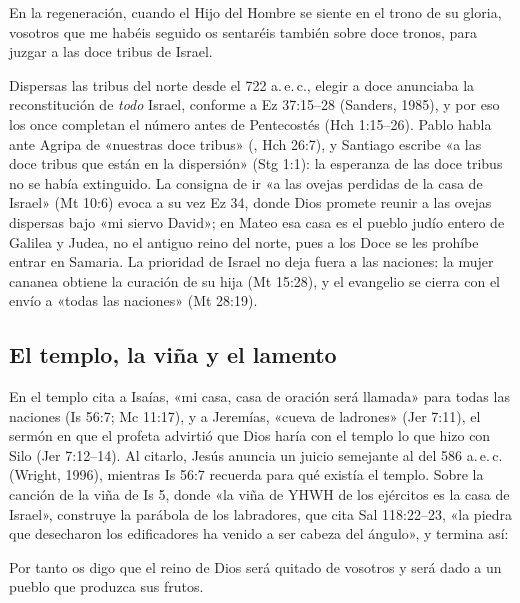 \begin{cita}En la regeneración, cuando el Hijo del Hombre se siente en el trono de su gloria, vosotros que me habéis seguido os sentaréis también sobre doce tronos, para juzgar a las doce tribus de Israel.\end{cita}

Dispersas las tribus del norte desde el 722 a.\,e.\,c., elegir a doce anunciaba la reconstitución de \emph{todo} Israel, conforme a Ez 37:15--28 (Sanders, 1985), y por eso los once completan el número antes de Pentecostés (Hch 1:15--26). Pablo habla ante Agripa de «nuestras doce tribus» (, Hch 26:7), y Santiago escribe «a las doce tribus que están en la dispersión» (Stg 1:1): la esperanza de las doce tribus no se había extinguido. La consigna de ir «a las ovejas perdidas de la casa de Israel» (Mt 10:6) evoca a su vez Ez 34, donde Dios promete reunir a las ovejas dispersas bajo «mi siervo David»; en Mateo esa casa es el pueblo judío entero de Galilea y Judea, no el antiguo reino del norte, pues a los Doce se les prohíbe entrar en Samaria. La prioridad de Israel no deja fuera a las naciones: la mujer cananea obtiene la curación de su hija (Mt 15:28), y el evangelio se cierra con el envío a «todas las naciones» (Mt 28:19).

\subsection{El templo, la viña y el lamento}
En el templo cita a Isaías, «mi casa, casa de oración será llamada» para todas las naciones (Is 56:7; Mc 11:17), y a Jeremías, «cueva de ladrones» (Jer 7:11), el sermón en que el profeta advirtió que Dios haría con el templo lo que hizo con Silo (Jer 7:12--14). Al citarlo, Jesús anuncia un juicio semejante al del 586 a.\,e.\,c. (Wright, 1996), mientras Is 56:7 recuerda para qué existía el templo. Sobre la canción de la viña de Is 5, donde «la viña de YHWH de los ejércitos es la casa de Israel», construye la parábola de los labradores, que cita Sal 118:22--23, «la piedra que desecharon los edificadores ha venido a ser cabeza del ángulo», y termina así:

\begin{cita}Por tanto os digo que el reino de Dios será quitado de vosotros y será dado a un pueblo que produzca sus frutos.\end{cita}


